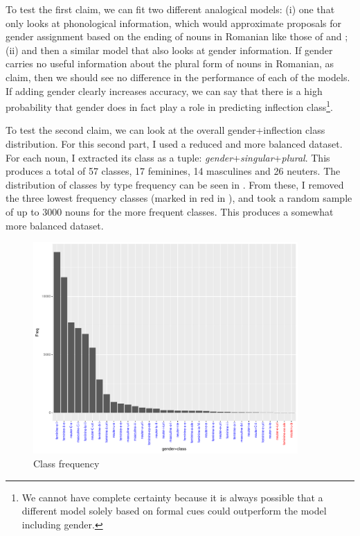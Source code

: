 To test the first claim, we can fit two different analogical models: (i) one that only looks at phonological information, which would approximate proposals for gender assignment based on the ending of nouns in Romanian like those of \textcite{Vrabie.1989} and \textcite{Vrabie.2000}; (ii) and then a similar model that also looks at gender information. If gender carries no useful information about the plural form of nouns in Romanian, as \textcite{Bateman.2010} claim, then we should see no difference in the performance of each of the models. If adding gender clearly increases accuracy, we can say that there is a high probability that gender does in fact play a role in predicting inflection class\footnote{We cannot have complete certainty because it is always possible that a different model solely based on formal cues could outperform the model including gender.}.

To test the second claim, we can look at the overall gender+inflection class distribution. For this second part, I used a reduced and more balanced dataset. For each noun, I extracted its class as a tuple: \textit{gender}+\textit{singular}+\textit{plural}. This produces a total of 57 classes, 17 feminines, 14  masculines and 26 neuters. The distribution of classes by type frequency can be seen in . From these, I removed the three lowest frequency classes (marked in red in ), and took a random sample of up to 3000 nouns for the more frequent classes. This produces a somewhat more balanced dataset.

\begin{figure}
  \centering
  \includegraphics[width=0.9\textwidth]{./figures/romanian/nclasses-plot.pdf}
  \caption{Class frequency}\label{fig:rumanian-classes}
\end{figure}

